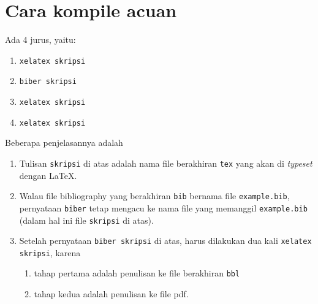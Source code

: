 \section{Cara kompile acuan}
Ada 4 jurus, yaitu:
\begin{enumerate}
\item \texttt{xelatex skripsi}
\item \texttt{biber skripsi}
\item \texttt{xelatex skripsi}
\item \texttt{xelatex skripsi}
\end{enumerate}
Beberapa penjelasannya adalah
\begin{enumerate}
\item Tulisan \texttt{skripsi} di atas adalah 
nama file berakhiran \texttt{tex} yang akan 
di \textit{typeset} dengan \LaTeX.
\item Walau file bibliography yang berakhiran 
\texttt{bib} bernama file \texttt{example.bib},
pernyataan \texttt{biber} tetap mengacu ke nama file
yang memanggil \texttt{example.bib} (dalam hal ini file 
\texttt{skripsi} 
di atas).  
\item Setelah pernyataan \texttt{biber skripsi} di atas,
harus dilakukan dua kali \texttt{xelatex skripsi},
karena 
\begin{enumerate}
\item tahap pertama adalah penulisan ke file berakhiran
\texttt{bbl}
\item tahap kedua adalah penulisan ke file pdf.
\end{enumerate}
\end{enumerate}
